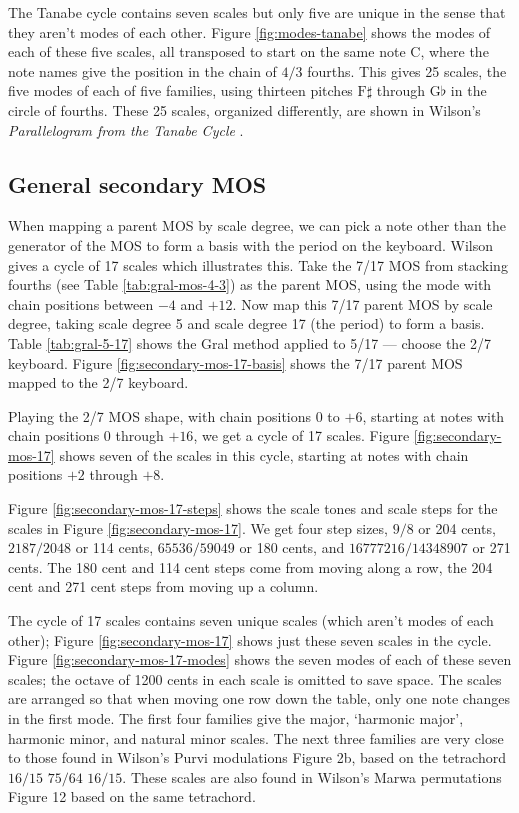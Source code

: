 \documentclass[a4paper,11pt]{article}
\begin{document}
The Tanabe cycle contains seven scales but only five are unique in the sense
that they aren't modes of each other. Figure \ref{fig:modes-tanabe} shows the
modes of each of these five scales, all transposed to start on the same note
$\mathrm{C}$, where the note names give the position in the chain of $4/3$
fourths.  This gives 25 scales, the five modes of each of five families, using
thirteen pitches $\mathrm{F}\sharp$ through $\mathrm{G}\flat$ in the circle of
fourths.  These 25 scales, organized differently, are shown in Wilson's
\textit{Parallelogram from the Tanabe Cycle} \cite[14]{wilsonmos}.

\clearpage
\subsection{General secondary MOS}
When mapping a parent MOS by scale degree, we can pick a note other than the
generator of the MOS to form a basis with the period on the keyboard. Wilson
gives a cycle of 17 scales \cite[6-8]{wilsonmos} which illustrates this.  Take
the 7/17 MOS from stacking fourths (see Table \ref{tab:gral-mos-4-3}) as the
parent MOS, using the mode with chain positions between $-4$ and $+12$. Now map
this 7/17 parent MOS by scale degree, taking scale degree 5 and scale degree 17
(the period) to form a basis. Table \ref{tab:gral-5-17} shows the Gral method
applied to 5/17 --- choose the 2/7 keyboard. Figure
\ref{fig:secondary-mos-17-basis} shows the 7/17 parent MOS mapped to the 2/7
keyboard.

Playing the 2/7 MOS shape, with chain positions $0$ to $+6$, starting at notes
with chain positions $0$ through $+16$, we get a cycle of 17 scales.  Figure
\ref{fig:secondary-mos-17} shows seven of the scales in this cycle, starting at
notes with chain positions $+2$ through $+8$.

Figure \ref{fig:secondary-mos-17-steps} shows the scale tones and scale steps
for the scales in Figure \ref{fig:secondary-mos-17}. We get four step sizes,
$9/8$ or 204 cents, $2187/2048$ or 114 cents, $65536/59049$ or 180 cents, and
$16777216/14348907$ or 271 cents. The 180 cent and 114 cent steps come from
moving along a row, the 204 cent and 271 cent steps from moving up a column.

The cycle of 17 scales contains seven unique scales (which aren't modes of each
other); Figure \ref{fig:secondary-mos-17} shows just these seven scales in the
cycle. Figure \ref{fig:secondary-mos-17-modes} shows the seven modes of each of
these seven scales; the octave of 1200 cents in each scale is omitted to save
space. The scales are arranged so that when moving one row down the table, only
one note changes in the first mode. The first four families give the major,
`harmonic major', harmonic minor, and natural minor scales.  The next three
families are very close to those found in Wilson's Purvi modulations
\cite{wilson1987purvi} Figure 2b, based on the tetrachord $16/15$ $75/64$
$16/15$. These scales are also found in Wilson's Marwa permutations
\cite{wilson1986marwa} Figure 12 based on the same tetrachord.
\end{document}
